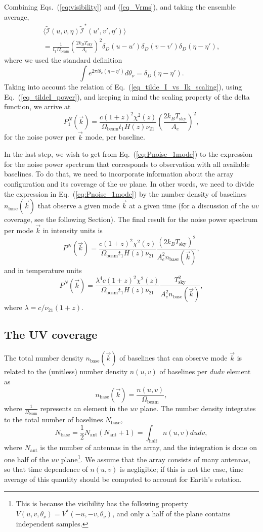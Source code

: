 \documentclass[aps,prd,twocolumn,floatfix,showpacs,superscriptaddress,nofootinbib]{revtex4-1}
\newcommand{\beq}{\begin{equation}}
\newcommand{\eeq}{\end{equation}}
\newcommand{\bga}{\begin{gathered}}
\newcommand{\ega}{\end{gathered}}
\newcommand{\eq}[1]{{Eq.~(#1)}}
\begin{document}
Combining Eqs.~(\ref{eq:visibility}) and (\ref{eq_Vrms}), and taking the ensemble average,
\beq
\bga
\langle\widetilde{\mathcal{I}}(u,v,\eta) \widetilde{\mathcal{I}}^*(u',v',\eta')\rangle \\
 = \frac{1}{t_1\Omega_\text{beam}}\left(\frac{2k_BT_\text{sky}}{A_e}\right)^2 \delta_D({u}-{u}')\delta_D({v}-{v}')\delta_D(\eta-\eta'),
\ega
\label{eq:mathcal_power_Vrms}
\eeq 
where we used the standard definition
\beq
\int e^{2\pi i \theta_\nu(\eta-\eta')}d\theta_\nu =\delta_D(\eta-\eta').
\eeq
Taking into account the relation of \eq{\ref{eq_tilde_I_vs_Ik_scaling}}, using \eq{\ref{eq_tildeI_power}}, and keeping in mind the scaling property of the delta function, we arrive at
\beq
P_1^N(\vec k) = \frac{c(1+z)^2\chi^2(z)}{\Omega_\text{beam}t_1H(z)\nu_{21}}\left(\frac{2k_BT_\text{sky}}{A_e}\right)^2 ,
\label{eq:Pnoise_1mode}
\eeq
for the noise power per $\vec k$ mode, per baseline.

In the last step, we wish to get from \eq{\ref{eq:Pnoise_1mode}} to the expression for the noise power spectrum that corresponds to observation with all available baselines. To do that, we need to incorporate information about the array configuration and its coverage of the $uv$ plane. In other words, we need to divide the expression in \eq{\ref{eq:Pnoise_1mode}} by the number density of baselines $n_\text{base}(\vec k)$ that observe a given mode $\vec k$ at a given time (for a discussion of the $uv$ coverage, see the following Section). The final result for the noise power spectrum per mode $\vec k$ in intensity units is 
\beq
P^N(\vec k) = \frac{c(1+z)^2\chi^2(z)}{\Omega_\text{beam}t_1H(z)\nu_{21}}\frac{\left(2k_BT_\text{sky}\right)^2}{A_e^2n_\text{base}(\vec k)},
\label{eq:Pnoise_Jy}
\eeq
and in temperature units
\beq
P^N(\vec k) =\frac{\lambda^4c(1+z)^2\chi^2(z)}{\Omega_\text{beam}t_1H(z)\nu_{21}}\frac{T_\text{sky}^2}{A_e^2n_\text{base}(\vec k)},
\label{eq:Pnoise_K}
\eeq
where $\lambda=c/\nu_{21}(1+z)$.

\subsection{The UV coverage}
\label{subsec:uv}

The total number density $n_\text{base}(\vec k)$ of baselines that can observe mode $\vec k$ is related to the (unitless) number density $n(u,v)$ of baselines per $dudv$ element as
\beq
n_\text{base}(\vec k) = \frac{n(u,v)}{\Omega_\text{beam}},
\label{eq:nuv_nk}
\eeq
where $\frac{1}{\Omega_\text{beam}}$ represents an element in the $uv$ plane. The number density integrates to the total number of baselines $N_\text{base}$,
\beq
N_\text{base}=\frac{1}{2}N_\text{ant}(N_\text{ant}+1) = \int_\text{half} n(u,v)dudv,
\label{eq:nk}
\eeq
where $N_\text{ant}$ is the number of antennas in the array, and the integration is done on one half of the $uv$ plane\footnote{This is because the visibility has the following property $V(u,v,\theta_\nu)=V^*(-u,-v,\theta_\nu)$, and only a half of the plane contains independent samples.}. We assume that the array consists of many antennas, so that time dependence of $n(u,v)$ is negligible; if this is not the case, time average of this quantity should be computed to account for Earth's rotation.
\end{document}
